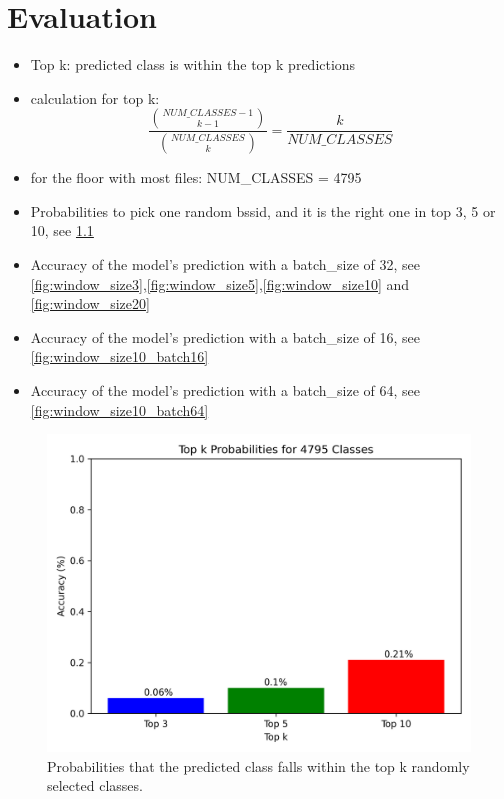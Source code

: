 \chapter{Evaluation}\label{sec:evaluation}

\begin{itemize}
    \item Top k: predicted class is within the top k predictions
    \item calculation for top k: 
    \[\frac{\binom{NUM\_CLASSES - 1}{k - 1}}{\binom{NUM\_CLASSES}{k}} = \frac{k}{NUM\_CLASSES}\]
    \item for the floor with most files: NUM\_CLASSES = 4795
    \item Probabilities to pick one random \ac{bssid}, and it is the right one in top 3, 5 or 10, see \cref{fig:random_accuracies_4795_classes}
    \item Accuracy of the model's prediction with a batch\_size of 32, see \cref{fig:window_size3},\cref{fig:window_size5},\cref{fig:window_size10} and \cref{fig:window_size20}
    \item Accuracy of the model's prediction with a batch\_size of 16, see \cref{fig:window_size10_batch16}
    \item Accuracy of the model's prediction with a batch\_size of 64, see \cref{fig:window_size10_batch64}
\end{itemize}

\begin{figure}[h!]
    \centering
    \includegraphics*[scale=0.8]{images/random_accuracies_4795_classes.png}
    \caption{Probabilities that the predicted class falls within the top k randomly selected classes.}
    \label{fig:random_accuracies_4795_classes}
\end{figure}


